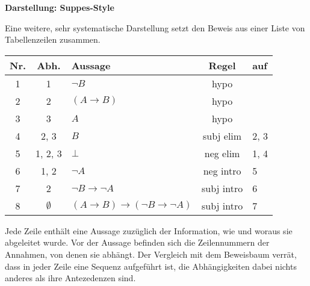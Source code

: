 \documentclass[8pt]{beamer}
\newcommand{\strong}[1]{\textsf{\textbf{#1}}}
\newcommand{\parspace}{\vspace{0.8em}}
\newcommand{\cond}{\rightarrow}
\begin{document}
\begin{frame}[t]
\vspace{0.5em}
\strong{Darstellung: Suppes-Style}

\parspace
Eine weitere, sehr systematische Darstellung setzt den Beweis aus
einer Liste von Tabellenzeilen zusammen.

\begin{center}
\begin{tabular}{cclcl}
\toprule
\strong{\small Nr.} & \strong{\small Abh.}
& \strong{\small Aussage} & \strong{\small Regel}
& \strong{\small auf}\\
\midrule
1 & 1 & $\neg B$ & hypo &\\
2 & 2 & $(A\cond B)$ & hypo &\\
3 & 3 & $A$ & hypo &\\
4 & 2, 3 & $B$ & subj elim & 2, 3\\
5 & 1, 2, 3 & $\bot$ & neg elim & 1, 4\\
6 & 1, 2 & $\neg A$ & neg intro & 5\\
7 & 2 & $\neg B\cond\neg A$ & subj intro & 6\\
8 & $\emptyset$ & $(A\cond B)\cond (\neg B\cond\neg A)$ & subj intro & 7\\
\bottomrule
\end{tabular}
\end{center}

\vspace{1em}
Jede Zeile enthält eine Aussage zuzüglich der Information, wie und woraus
sie abgeleitet wurde. Vor der Aussage befinden sich die
Zeilennummern der Annahmen, von denen sie abhängt. Der Vergleich mit dem
Beweisbaum verrät, dass in jeder Zeile eine Sequenz aufgeführt ist, die
Abhängigkeiten dabei nichts anderes als ihre Antezedenzen sind.

\end{frame}
\end{document}

